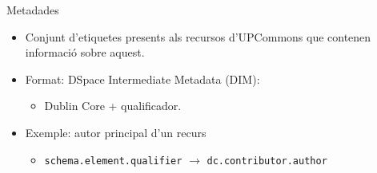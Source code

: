 \begin{frame}{Metadades}
    \begin{itemize}[<+- | alert@+>]
        \item Conjunt d’etiquetes presents als recursos d’UPCommons que contenen informació sobre aquest.
        \item Format: DSpace Intermediate Metadata (DIM):
        \begin{itemize}[<+- | alert@+>]
            \item Dublin Core + qualificador.
        \end{itemize}
        \item Exemple: autor principal d'un recurs
        \begin{itemize}[<+- | alert@+>]
            \item \texttt{schema.element.qualifier} \(\rightarrow\) \texttt{dc.contributor.author}
        \end{itemize}
    \end{itemize}
\end{frame}